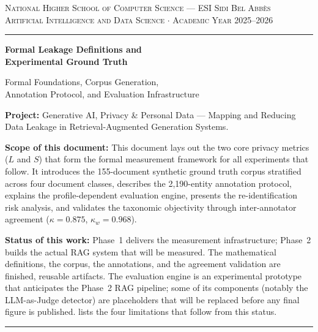 \documentclass[12pt, a4paper]{report}
\begin{document}
\begin{titlepage}
\begin{center}

\vspace*{1.2cm}

{\small\color{steel}\textsc{National Higher School of Computer Science --- ESI Sidi Bel Abb\`{e}s}}\\[0.15cm]
{\small\color{steel}\textsc{Artificial Intelligence and Data Science $\cdot$ Academic Year 2025--2026}}

\vspace{0.5cm}
{\color{navy}\rule{\textwidth}{1.2pt}}
\vspace{1.6cm}

{\color{navy}\Huge\bfseries Formal Leakage Definitions and\\[0.3cm] Experimental Ground Truth}

\vspace{0.8cm}

{\color{steel}\large Formal Foundations, Corpus Generation,\\[0.1cm]
Annotation Protocol, and Evaluation Infrastructure}

\vspace{2cm}

\begin{prosebox}
{\small\textbf{Project:} Generative AI, Privacy \& Personal Data --- Mapping and Reducing Data Leakage in Retrieval-Augmented Generation Systems.

\medskip
\textbf{Scope of this document:} This document lays out the two core privacy metrics ($L$ and $S$) that form the formal measurement framework for all experiments that follow. It introduces the 155-document synthetic ground truth corpus stratified across four document classes, describes the 2{,}190-entity annotation protocol, explains the profile-dependent evaluation engine, presents the re-identification risk analysis, and validates the taxonomic objectivity through inter-annotator agreement ($\kappa = 0.875$, $\kappa_w = 0.968$).

\medskip
\textbf{Status of this work:} Phase~1 delivers the measurement infrastructure; Phase~2 builds the actual RAG system that will be measured. The mathematical definitions, the corpus, the annotations, and the agreement validation are finished, reusable artifacts. The evaluation engine is an experimental prototype that anticipates the Phase~2 RAG pipeline; some of its components (notably the LLM-as-Judge detector) are placeholders that will be replaced before any final figure is published.  lists the four limitations that follow from this status.}
\end{prosebox}

\vfill
{\color{navy}\rule{\textwidth}{1.2pt}}

\end{center}
\end{titlepage}
\end{document}
